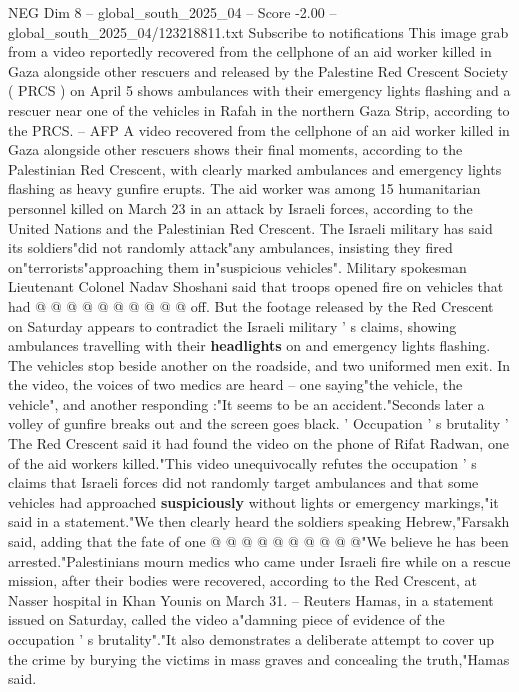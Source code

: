 \begin{textsample}{NEG Dim 8 – global\_south\_2025\_04 – Score -2.00 – global\_south\_2025\_04/123218811.txt}  \label{ex:f8_neg_044}
Subscribe to notifications This image grab from a video reportedly recovered from the cellphone of an aid worker killed in Gaza alongside other rescuers and released by the Palestine Red Crescent Society ( PRCS ) on April 5 shows ambulances with their emergency lights flashing and a rescuer near one of the vehicles in Rafah in the northern Gaza Strip, according to the PRCS. -- AFP A video recovered from the cellphone of an aid worker killed in Gaza alongside other rescuers shows their final moments, according to the Palestinian Red Crescent, with clearly marked ambulances and emergency lights flashing as heavy gunfire erupts.
The aid worker was among 15 humanitarian personnel killed on March 23 in an attack by Israeli forces, according to the United Nations and the Palestinian Red Crescent.
The Israeli military has said its soldiers"did not randomly attack"any ambulances, insisting they fired on"terrorists"approaching them in"suspicious vehicles".
Military spokesman Lieutenant Colonel Nadav Shoshani said that troops opened fire on vehicles that had @ @ @ @ @ @ @ @ @ @ off.
But the footage released by the Red Crescent on Saturday appears to contradict the Israeli military ' s claims, showing ambulances travelling with their \textbf{headlights} on and emergency lights flashing.
The vehicles stop beside another on the roadside, and two uniformed men exit.
In the video, the voices of two medics are heard -- one saying"the vehicle, the vehicle", and another responding :"It seems to be an accident."Seconds later a volley of gunfire breaks out and the screen goes black. ' Occupation ' s brutality ' The Red Crescent said it had found the video on the phone of Rifat Radwan, one of the aid workers killed."This video unequivocally refutes the occupation ' s claims that Israeli forces did not randomly target ambulances and that some vehicles had approached \textbf{suspiciously} without lights or emergency markings,"it said in a statement."We then clearly heard the soldiers speaking Hebrew,"Farsakh said, adding that the fate of one @ @ @ @ @ @ @ @ @ @"We believe he has been arrested."Palestinians mourn medics who came under Israeli fire while on a rescue mission, after their bodies were recovered, according to the Red Crescent, at Nasser hospital in Khan Younis on March 31. -- Reuters Hamas, in a statement issued on Saturday, called the video a"damning piece of evidence of the occupation ' s brutality"."It also demonstrates a deliberate attempt to cover up the crime by burying the victims in mass graves and concealing the truth,"Hamas said.

\end{textsample}
